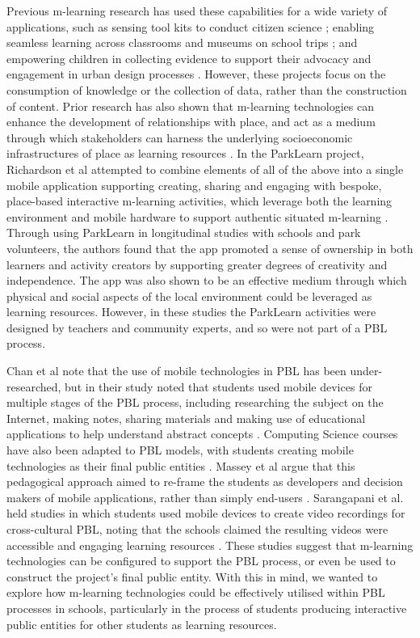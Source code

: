 \documentclass[,hyphens]{sigchi}
\begin{document}
Previous m-learning research has used these capabilities for a wide variety of applications, such as sensing tool kits to conduct citizen science \cite{Sharples2017}; enabling seamless learning across classrooms and museums on school trips \cite{Vavoula2009}; and empowering children in collecting evidence to support their advocacy and engagement in urban design processes \cite{Peacock2018}. However, these projects focus on the consumption of knowledge or the collection of data, rather than the construction of content. Prior research has also shown that m-learning technologies can enhance the development of relationships with place, and act as a medium through which stakeholders can harness the underlying socioeconomic infrastructures of place as learning resources \cite{Richardson2017}. In the ParkLearn project, Richardson et al attempted to combine elements of all of the above into a single mobile application supporting creating, sharing and engaging with bespoke, place-based interactive m-learning activities, which leverage both the learning environment and mobile hardware to support authentic situated m-learning \cite{Richardson2018}. Through using ParkLearn in longitudinal studies with schools and park volunteers, the authors found that the app promoted a sense of ownership in both learners and activity creators by supporting greater degrees of creativity and independence. The app was also shown to be an effective medium through which physical and social aspects of the local environment could be leveraged as learning resources. However, in these studies the ParkLearn activities were designed by teachers and community experts, and so were not part of a PBL process.

Chan et al note that the use of mobile technologies in PBL has been under-researched, but in their study noted that students used mobile devices for multiple stages of the PBL process, including researching the subject on the Internet, making notes, sharing materials and making use of educational applications to help understand abstract concepts \cite{Chan2015}. Computing Science courses have also been adapted to PBL models, with students creating mobile technologies as their final public entities \cite{Massey2006, Rahman2018}. Massey et al argue that this pedagogical approach aimed to re-frame the students as developers and decision makers of mobile applications, rather than simply end-users \cite{Massey2006}. Sarangapani et al. held studies in which students used mobile devices to create video recordings for cross-cultural PBL, noting that the schools claimed the resulting videos were accessible and engaging learning resources \cite{Sarangapani2016}. These studies suggest that m-learning technologies can be configured to support the PBL process, or even be used to construct the project's final public entity. With this in mind, we wanted to explore how m-learning technologies could be effectively utilised within PBL processes in schools, particularly in the process of students producing interactive public entities for other students as learning resources.
\end{document}

